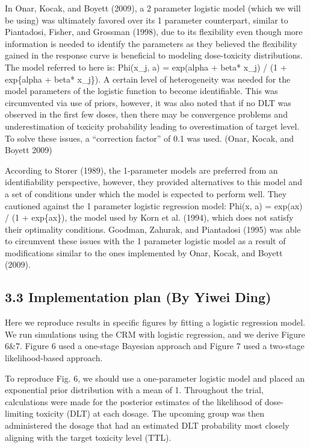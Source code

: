 \documentclass[
]{article}
\begin{document}
In Onar, Kocak, and Boyett (2009), a 2 parameter logistic model (which
we will be using) was ultimately favored over its 1 parameter
counterpart, similar to Piantadosi, Fisher, and Grossman (1998), due to
its flexibility even though more information is needed to identify the
parameters as they believed the flexibility gained in the response curve
is beneficial to modeling dose-toxicity distributions. The model
referred to here is: Phi(x\_j, a) = exp(alpha + beta* x\_j) / (1 +
exp\{alpha + beta* x\_j\}). A certain level of heterogeneity was needed
for the model parameters of the logistic function to become
identifiable. This was circumvented via use of priors, however, it was
also noted that if no DLT was observed in the first few doses, then
there may be convergence problems and underestimation of toxicity
probability leading to overestimation of target level. To solve these
issues, a ``correction factor'' of 0.1 was used. (Onar, Kocak, and
Boyett 2009)

According to Storer (1989), the 1-parameter models are preferred from an
identifiability perspective, however, they provided alternatives to this
model and a set of conditions under which the model is expected to
perform well. They cautioned against the 1 parameter logistic regression
model: Phi(x, a) = exp(ax) / (1 + exp\{ax\}), the model used by Korn et
al. (1994), which does not satisfy their optimality conditions. Goodman,
Zahurak, and Piantadosi (1995) was able to circumvent these issues with
the 1 parameter logistic model as a result of modifications similar to
the ones implemented by Onar, Kocak, and Boyett (2009).

\hypertarget{implementation-plan-by-yiwei-ding}{%
\subsection{3.3 Implementation plan (By Yiwei
Ding)}\label{implementation-plan-by-yiwei-ding}}

Here we reproduce results in specific figures by fitting a logistic
regression model. We run simulations using the CRM with logistic
regression, and we derive Figure 6\&7. Figure 6 used a one-stage
Bayesian approach and Figure 7 used a two-stage likelihood-based
approach.

To reproduce Fig. 6, we should use a one-parameter logistic model and
placed an exponential prior distribution with a mean of 1. Throughout
the trial, calculations were made for the posterior estimates of the
likelihood of dose-limiting toxicity (DLT) at each dosage. The upcoming
group was then administered the dosage that had an estimated DLT
probability most closely aligning with the target toxicity level (TTL).
\end{document}
